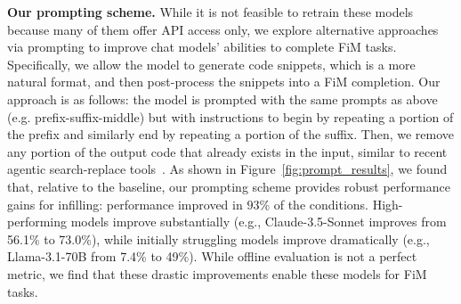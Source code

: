 \textbf{Our prompting scheme.}
While it is not feasible to retrain these models because many of them offer API access only, we explore alternative approaches via prompting to improve chat models' abilities to complete FiM tasks.
Specifically, we allow the model to generate code snippets, which is a more natural format, and then post-process the snippets into a FiM completion.
Our approach is as follows:
the model is prompted with the same prompts as above (e.g. prefix-suffix-middle) but with instructions to begin by repeating a portion of the prefix and similarly end by repeating a portion of the suffix. 
Then, we remove any portion of the output code that already exists in the input, similar to recent agentic search-replace tools~\citep{searchreplace}.
As shown in Figure~\ref{fig:prompt_results}, we found that, relative to the baseline, our prompting scheme provides robust performance gains for infilling: performance improved in $93$\% of the conditions.
High-performing models improve substantially (e.g., Claude-3.5-Sonnet improves from 56.1\% to 73.0\%), while initially struggling models improve dramatically (e.g., Llama-3.1-70B from 7.4\% to 49\%).
While offline evaluation is not a perfect metric, we find that these drastic improvements enable these models for FiM tasks.
































